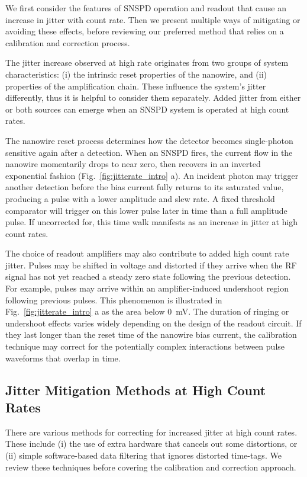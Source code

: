 \documentclass[11pt]{caltech_thesis} %
\begin{document}
We first consider the features of SNSPD operation and readout that cause an increase in jitter with count rate. Then we present multiple ways of mitigating or avoiding these effects, before reviewing our preferred method that relies on a calibration and correction process.

The jitter increase observed at high rate originates from two groups of system characteristics: (i) the intrinsic reset properties of the nanowire, and (ii) properties of the amplification chain. These influence the system's jitter differently, thus it is helpful to consider them separately. Added jitter from either or both sources can emerge when an SNSPD system is operated at high count rates.

The nanowire reset process determines how the detector becomes single-photon sensitive again after a detection. When an SNSPD fires, the current flow in the nanowire momentarily drops to near zero, then recovers in an inverted exponential fashion (Fig.~\ref{fig:jitterate_intro} a). An incident photon may trigger another detection before the bias current fully returns to its saturated value, producing a pulse with a lower amplitude and slew rate. A fixed threshold comparator will trigger on this lower pulse later in time than a full amplitude pulse. If uncorrected for, this time walk manifests as an increase in jitter at high count rates.

The choice of readout amplifiers may also contribute to added high count rate jitter. Pulses may be shifted in voltage and distorted if they arrive when the RF signal has not yet reached a steady zero state following the previous detection. For example, pulses may arrive within an amplifier-induced undershoot region following previous pulses. This phenomenon is illustrated in Fig.~\ref{fig:jitterate_intro} a as the area below 0~mV. The duration of ringing or undershoot effects varies widely depending on the design of the readout circuit. If they last longer than the reset time of the nanowire bias current, the calibration technique may correct for the potentially complex interactions between pulse waveforms that overlap in time.

\hypertarget{jitter-mitigation-methods-at-high-count-rates}{%
\subsection{Jitter Mitigation Methods at High Count Rates}\label{jitter-mitigation-methods-at-high-count-rates}}

There are various methods for correcting for increased jitter at high count rates. These include (i) the use of extra hardware that cancels out some distortions, or (ii) simple software-based data filtering that ignores distorted time-tags. We review these techniques before covering the calibration and correction approach.
\end{document}
